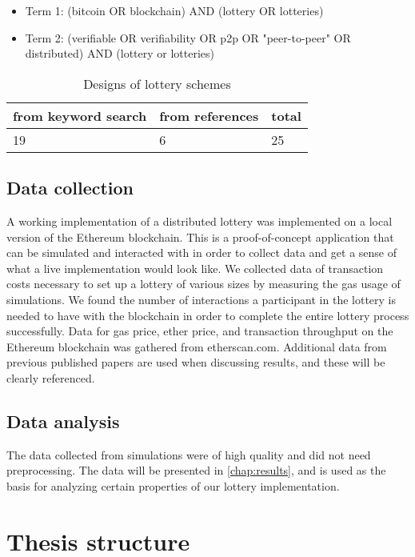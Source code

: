 \begin{itemize}
    \item Term 1: (bitcoin OR blockchain) AND (lottery OR lotteries) 
    \item Term 2: (verifiable OR verifiability OR p2p OR "peer-to-peer" OR distributed) AND (lottery or lotteries)
\end{itemize}

\begin{table}[h]
\centering
\caption{Designs of lottery schemes}
\begin{tabular}{|l|l|l|}
\hline

from keyword search & from references & total \\ \hline
19 & 6 & 25 \\ \hline

\end{tabular}
\end{table}

\subsection{Data collection}

A working implementation of a distributed lottery was implemented on a local version of the Ethereum blockchain. This is a proof-of-concept application that can be simulated and interacted with in order to collect data and get a sense of what a live implementation would look like. 
We collected data of transaction costs necessary to set up a lottery of various sizes by measuring the gas usage of simulations. 
We found the number of interactions a participant in the lottery is needed to have with the blockchain in order to complete the entire lottery process successfully. 
Data for gas price, ether price, and transaction throughput on the Ethereum blockchain was gathered from etherscan.com. 
Additional data from previous published papers are used when discussing results, and these will be clearly referenced.

\subsection{Data analysis}

The data collected from simulations were of high quality and did not need preprocessing. The data will be presented in \ref{chap:results}, and is used as the basis for analyzing certain properties of our lottery implementation. 

\section{Thesis structure}

